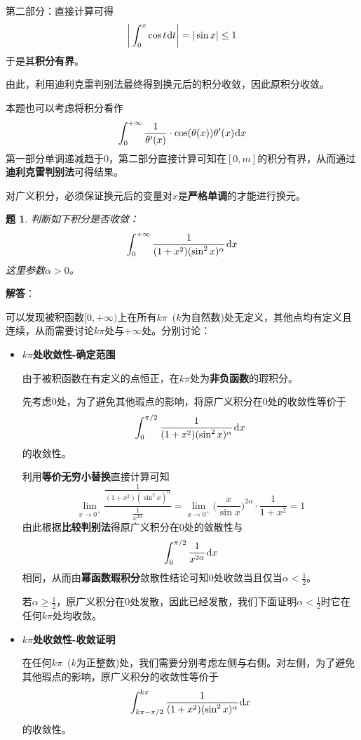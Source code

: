 \documentclass[a4paper,UTF8,fontset=windows,AutoFakeBold]{ctexart}
\newcommand*{\dr}{\hspace{0.07em}\mathrm{d}}
\newcommand*{\note}{\noindent *}
\theoremstyle{ex}
\newtheorem{exercise}{题}
\newcommand{\sol}[1]{{\vspace{5pt}\kaishu\noindent\textbf{解答}：\vspace{-3pt}
\begin{compactitem}
    \item[] #1
\end{compactitem}
}}
\begin{document}
\begin{framed}
{\begin{itemize}
        第二部分：直接计算可得
        $$\bigg|\int_0^x\cos t\dr t\bigg|=|\sin x|\le1$$
        于是其\textbf{积分有界}。

        由此，利用迪利克雷判别法最终得到换元后的积分收敛，因此原积分收敛。
    \end{itemize}

    \note 本题也可以考虑将积分看作
    $$\int_0^{+\infty}\frac{1}{\theta'(x)}\cdot\cos(\theta(x))\theta'(x)\dr x$$
    第一部分单调递减趋于0，第二部分直接计算可知在$[0,m]$的积分有界，从而通过\textbf{迪利克雷判别法}可得结果。
}
\end{framed}

\note 对广义积分，必须保证换元后的变量对$x$是\textbf{严格单调}的才能进行换元。

\begin{framed}
\begin{exercise}
    判断如下积分是否收敛：
    $$\int_0^{+\infty}\frac{1}{(1+x^2)(\sin^2x)^\alpha}\dr x$$
    这里参数$\alpha>0$。
\end{exercise}
\sol{
    可以发现被积函数$[0,+\infty)$上在所有$k\pi$\ ($k$为自然数)处无定义，其他点均有定义且连续，从而需要讨论$k\pi$处与$+\infty$处。分别讨论：
    \begin{itemize}
        \item \textbf{$k\pi$处收敛性-确定范围}
        
        由于被积函数在有定义的点恒正，在$k\pi$处为\textbf{非负函数}的瑕积分。

        先考虑0处，为了避免其他瑕点的影响，将原广义积分在0处的收敛性等价于
        $$\int_0^{\pi/2}\frac{1}{(1+x^2)(\sin^2x)^\alpha}\dr x$$
        的收敛性。

        利用\textbf{等价无穷小替换}直接计算可知
        $$\lim_{x\to0^+}\frac{\frac{1}{(1+x^2)(\sin^2x)^\alpha}}{\frac{1}{x^{2\alpha}}}=\lim_{x\to0^+}\bigg(\frac{x}{\sin x}\bigg)^{2\alpha}\cdot\frac{1}{1+x^2}=1$$
        由此根据\textbf{比较判别法}得原广义积分在0处的敛散性与
        $$\int_0^{\pi/2}\frac{1}{x^{2\alpha}}\dr x$$
        相同，从而由\textbf{幂函数瑕积分}敛散性结论可知0处收敛当且仅当$\alpha<\frac{1}{2}$。

        若$\alpha\ge\frac{1}{2}$，原广义积分在0处发散，因此已经发散，我们下面证明$\alpha<\frac{1}{2}$时它在任何$k\pi$处均收敛。

        \item \textbf{$k\pi$处收敛性-收敛证明}
        
        在任何$k\pi$\ ($k$为正整数)处，我们需要分别考虑左侧与右侧。对左侧，为了避免其他瑕点的影响，原广义积分的收敛性等价于
        $$\int_{k\pi-\pi/2}^{k\pi}\frac{1}{(1+x^2)(\sin^2x)^\alpha}\dr x$$
        的收敛性。


\end{itemize}}
\end{framed}
\end{document}

